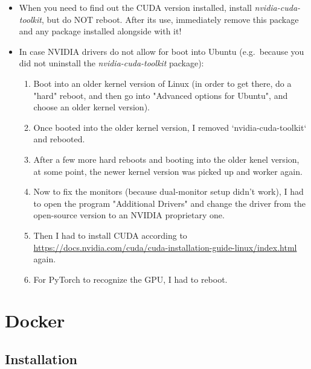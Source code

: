 \documentclass[12pt, a4paper]{article}
\numberwithin{equation}{section}
\theoremstyle{definition}
\theoremstyle{definition}
\begin{document}
	\begin{itemize}
		\item When you need to find out the CUDA version installed, install \textit{nvidia-cuda-toolkit}, but do NOT reboot. After its use, immediately remove this package and any package installed alongside with it!
		
		\item In case NVIDIA drivers do not allow for boot into Ubuntu (e.g.~because you did not uninstall the \textit{nvidia-cuda-toolkit} package): 
		\begin{enumerate}
			\item Boot into an older kernel version of Linux (in order to get there, do a "hard" reboot, and then go into "Advanced options for Ubuntu", and choose an older kernel version). 
			\item Once booted into the older kernel version, I removed `nvidia-cuda-toolkit` and rebooted. 
			\item After a few more hard reboots and booting into the older kenel version, at some point, the newer kernel version was picked up and worker again. 
			\item Now to fix the monitors (because dual-monitor setup didn't work), I had to open the program "Additional Drivers" and change the driver from the open-source version to an NVIDIA proprietary one. 
			\item Then I had to install CUDA according to \url{https://docs.nvidia.com/cuda/cuda-installation-guide-linux/index.html} again. 
			\item For PyTorch to recognize the GPU, I had to reboot. 
		\end{enumerate}
		
	\end{itemize}
	
	
		\newpage 
	\section{Docker}
	\subsection{Installation}
	
\end{document}

